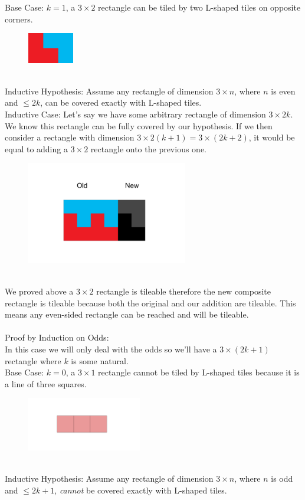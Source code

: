 \documentclass[12pt]{article}
\begin{document}
Base Case: $k=1$, a $3 \times 2$ rectangle can be tiled by two L-shaped tiles on opposite corners.
\begin{figure}[h]
\includegraphics[width=2cm]{3x2}
\centering
\end{figure}
\\
\indent
Inductive Hypothesis: Assume any rectangle of dimension $3 \times n$, where $n$ is even and $\leq 2k$, can be covered exactly with L-shaped tiles.\\

Inductive Case: Let's say we have some arbitrary rectangle of dimension $3 \times 2k$. We know this rectangle can be fully covered by our hypothesis. If we then consider a rectangle with dimension $3 \times 2(k+1) = 3 \times (2k +2)$, it would be equal to adding a $3 \times 2$ rectangle onto the previous one.
\begin{figure}[h]
\includegraphics[width=7cm]{composite}
\centering
\end{figure}
\\
We proved above a $3 \times 2$ rectangle is tileable therefore the new composite rectangle is tileable because both the original and our addition are tileable. This means any even-sided rectangle can be reached and will be tileable.\\
\noindent \\
Proof by Induction on Odds:\\
In this case we will only deal with the odds so we'll have a $3 \times (2k+1)$ rectangle where $k$ is some natural.\\

Base Case: $k=0$, a $3 \times 1$ rectangle cannot be tiled by L-shaped tiles because it is a line of three squares.
\begin{figure}[h]
\includegraphics[width=5cm]{3x1}
\centering
\end{figure}
\\
\indent
Inductive Hypothesis: Assume any rectangle of dimension $3 \times n$, where $n$ is odd and $\leq 2k+1$, \textit{cannot} be covered exactly with L-shaped tiles.\\
\end{document}
